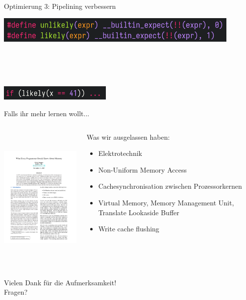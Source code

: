 \documentclass{beamer}
\begin{document}
\begin{frame}{Optimierung 3: Pipelining verbessern}
\centerline{\includegraphics[width=12cm]{likely1.png}}
~\\~\\~~
\centerline{\includegraphics[width=5.5cm]{likely2.png}}
\end{frame}

\begin{frame}{Falls ihr mehr lernen wollt...}
\begin{columns}
    \begin{column}{0.48\textwidth}
        \centerline{\includegraphics[height=7cm]{paper.png}}
    \end{column}
    
    \begin{column}{0.48\textwidth}
        Was wir ausgelassen haben:
        \begin{itemize}
            \item Elektrotechnik
            \item Non-Uniform Memory Access
            \item Cachesynchronisation zwischen Prozessorkernen
            \item Virtual Memory, Memory Management Unit, Translate Lookaside Buffer
            \item Write cache flushing
        \end{itemize}
    \end{column}
\end{columns}
\end{frame}

\begin{frame}
\centering
{\Huge
Vielen Dank f\"ur die Aufmerksamkeit!
}\\
Fragen?
\end{frame}
\end{document}
